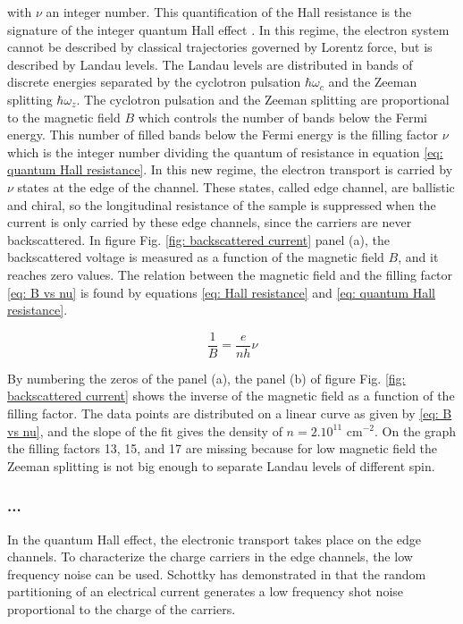 with $\nu$ an integer number.
This quantification of the Hall resistance is the signature of the integer quantum Hall effect \cite{von1986quantized}.
In this regime, the electron system cannot be described by classical trajectories governed by Lorentz force, but is described by Landau levels.
The Landau levels are distributed in bands of discrete energies separated by the cyclotron pulsation $\hbar\omega_{c}$ and the Zeeman splitting $\hbar\omega_{z}$.
The cyclotron pulsation and the Zeeman splitting are proportional to the magnetic field $B$ which controls the number of bands below the Fermi energy.
This number of filled bands below the Fermi energy is the filling factor $\nu$ which is the integer number dividing the quantum of resistance in equation \eqref{eq: quantum Hall resistance}.
In this new regime, the electron transport is carried by $\nu$ states at the edge of the channel.
These states, called edge channel, are ballistic and chiral, so the longitudinal resistance of the sample is suppressed when the current is only carried by these edge channels, since the carriers are never backscattered.
In figure Fig. \ref{fig: backscattered current} panel (a), the backscattered voltage is measured as a function of the magnetic field $B$, and it reaches zero values.
The relation between the magnetic field and the filling factor \eqref{eq: B vs nu} is found by equations \eqref{eq: Hall resistance} and \eqref{eq: quantum Hall resistance}.

\begin{equation}
\frac{1}{B} = \frac{e}{nh}\nu \label{eq: B vs nu}
\end{equation}

By numbering the zeros of the panel (a), the panel (b) of figure Fig. \ref{fig: backscattered current} shows the inverse of the magnetic field as a function of the filling factor.
The data points are distributed on a linear curve as given by \eqref{eq: B vs nu}, and the slope of the fit gives the density of $n = 2.10^{11}$ cm$^{-2}$.
On the graph the filling factors 13, 15, and 17 are missing because for low magnetic field the Zeeman splitting is not big enough to separate Landau levels of different spin.

\subsubsection*{...}


In the quantum Hall effect, the electronic transport takes place on the edge channels.
To characterize the charge carriers in the edge channels, the low frequency noise can be used.
Schottky has demonstrated in \cite{schottky1918regarding} that the random partitioning of an electrical current generates a low frequency shot noise proportional to the charge of the carriers.


